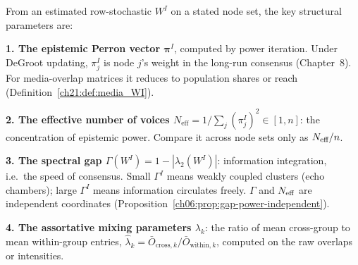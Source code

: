 \documentclass[../structural_economics_book.tex]{subfiles}
\begin{document}
\begin{definition}\label{ch21:prop:estimation}
From an estimated row-stochastic $W^I$ on a stated node set, the key structural parameters are:

\textbf{1. The epistemic Perron vector $\boldsymbol{\pi}^I$}, computed by power iteration. Under DeGroot updating, $\pi^I_j$ is node $j$'s weight in the long-run consensus (Chapter~8). For media-overlap matrices it reduces to population shares or reach (Definition~\ref{ch21:def:media_WI}).

\textbf{2. The effective number of voices $N_{\text{eff}} = 1/\sum_j (\pi^I_j)^2 \in [1, n]$}: the concentration of epistemic power. Compare it across node sets only as $N_{\text{eff}}/n$.

\textbf{3. The spectral gap $\Gamma(W^I) = 1 - |\lambda_2(W^I)|$}: information integration, i.e.\ the speed of consensus. Small $\Gamma^I$ means weakly coupled clusters (echo chambers); large $\Gamma^I$ means information circulates freely. $\Gamma$ and $N_{\text{eff}}$ are independent coordinates (Proposition~\ref{ch06:prop:gap-power-independent}).

\textbf{4. The assortative mixing parameters $\lambda_k$}: the ratio of mean cross-group to mean within-group entries, $\hat{\lambda}_k = \bar{O}_{\text{cross}, k} / \bar{O}_{\text{within}, k}$, computed on the raw overlaps or intensities.
\end{definition}
\end{document}
